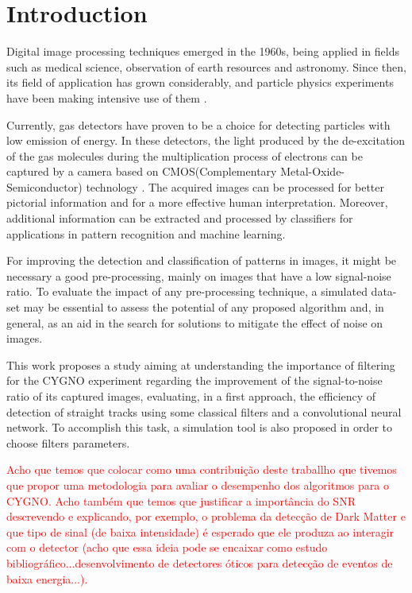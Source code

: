 \documentclass[
        oneside,      %
        english,			
        brazil			 
        ]{abntbibufjf}
\begin{document}

\textual


\chapter{Introduction}  %

Digital image processing techniques emerged in the 1960s, being applied in fields such as medical science, observation of earth resources and astronomy.
Since then, its field of application has grown considerably, and particle physics experiments have been making intensive use of them \cite{gonzalez2002digital}.

Currently, gas detectors have proven to be a choice for detecting particles with low emission of energy. In these detectors, the light produced by the de-excitation of the gas molecules during the multiplication process of electrons can be captured by a camera based on CMOS(Complementary Metal-Oxide-Semiconductor) technology \cite{marafini2018study}. The acquired images can be processed for better pictorial information and for a more effective human interpretation. Moreover, additional information can be extracted and processed by classifiers for applications in pattern recognition and machine learning.

For improving the detection and classification of patterns in images, it might be necessary a good pre-processing, mainly on images that have a low signal-noise ratio. To evaluate the impact of any pre-processing technique, a simulated data-set may be essential to assess the potential of any proposed algorithm and, in general, as an aid in the search for solutions to mitigate the effect of noise on images.

This work proposes a study aiming at understanding the importance of filtering for the CYGNO experiment \cite{bib:eps} regarding the improvement of the signal-to-noise ratio of its captured images, evaluating, in a first approach, the efficiency of detection of straight tracks using some classical filters and a convolutional neural network. To accomplish this task, a simulation tool is also proposed in order to choose filters parameters.

\textcolor{red}{Acho que temos que colocar como uma contribuição deste traballho que tivemos que propor uma metodologia para avaliar o desempenho dos algoritmos para o CYGNO. Acho também que temos que justificar a importância do SNR descrevendo e explicando, por exemplo, o problema da detecção de Dark Matter e que tipo de sinal (de baixa intensidade) é esperado que ele produza ao interagir com o detector (acho que essa ideia pode se encaixar como estudo bibliográfico...desenvolvimento de detectores óticos para detecção de eventos de baixa energia...).}
\end{document}

